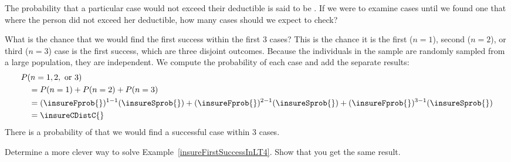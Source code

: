 \begin{exercisewrap}
\begin{nexercise}
The probability that a particular case would not exceed their
deductible is said to be \insureSprob{}.
If we were to examine cases until we found one that where
the person did not exceed her deductible, how many cases should
we expect to check?\footnotemark{}
\end{nexercise}
\end{exercisewrap}

\begin{examplewrap}
\begin{nexample}{What is the chance that we would find
    the first success within the first 3 cases?}
  \label{insureFirstSuccessInLT4}%
  This is the chance it is the first ($n=1$), second ($n=2$),
  or third ($n=3$) case is the first success, which are three
  disjoint outcomes.
  Because the individuals in the sample are randomly sampled
  from a large population, they are independent.
  We compute the probability of each case and add the separate
  results:
  \begin{align*}
  &P(n=1, 2, \text{ or }3) \\
    & \quad = P(n=1)+P(n=2)+P(n=3) \\
    & \quad = (\insureFprob{})^{1-1}(\insureSprob{})
        + (\insureFprob{})^{2-1}(\insureSprob{})
        + (\insureFprob{})^{3-1}(\insureSprob{}) \\
    & \quad = \insureCDistC{}
  \end{align*}
  There is a probability of \insureCDistC{} that we would
  find a successful case within 3 cases.
\end{nexample}
\end{examplewrap}

\begin{exercisewrap}
\begin{nexercise}
Determine a more clever way to solve Example~\ref{insureFirstSuccessInLT4}.
Show that you get the same result.\footnotemark{}
\end{nexercise}
\end{exercisewrap}

